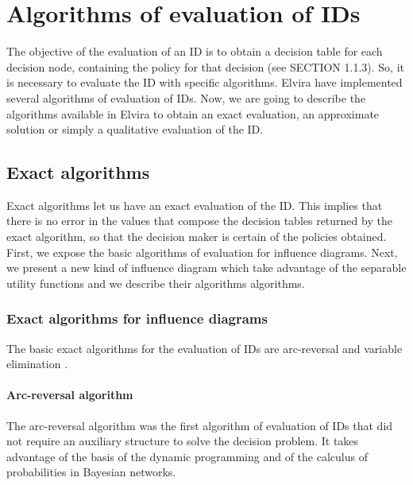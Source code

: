 


\section{Algorithms of evaluation of IDs}

The objective of the evaluation of an ID is to obtain a decision table for
each decision node, containing the policy for that decision (see SECTION
1.1.3). So, it is necessary to evaluate the ID with specific algorithms.
Elvira have implemented several algorithms of evaluation of IDs. Now, we are
going to describe the algorithms available in Elvira to obtain an exact
evaluation, an approximate solution or simply a qualitative evaluation of
the ID.

\subsection{Exact algorithms}

Exact algorithms let us have an exact evaluation of the ID. This implies
that there is no error in the values that compose the decision tables
returned by the exact algorithm, so that the decision maker is certain of
the policies obtained. First, we expose the basic algorithms of evaluation
for influence diagrams. Next, we present a new kind of influence diagram
which take advantage of the separable utility functions and we describe
their algorithms algorithms.

\subsubsection{Exact algorithms for influence diagrams}

The basic exact algorithms for the evaluation of IDs are arc-reversal \cite%
{shachter86} and variable elimination \cite{jensen01}.

\paragraph{Arc-reversal algorithm}

The arc-reversal algorithm \cite{shachter86} was the first algorithm of
evaluation of IDs that did not require an auxiliary structure to solve the
decision problem. It takes advantage of the basis of the dynamic programming
and of the calculus of probabilities in Bayesian networks.

